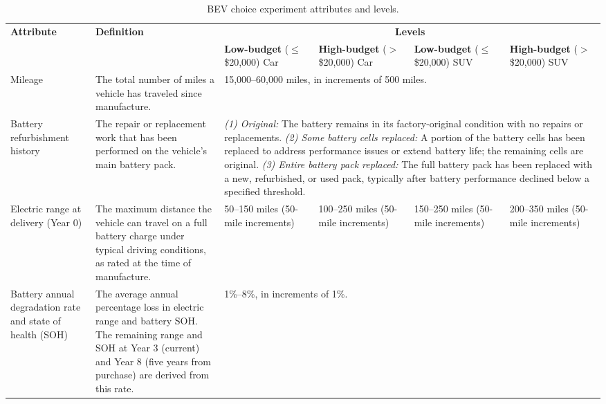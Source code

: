 \documentclass[a4paper,fleqn]{cas-sc}   %
\begin{document}
\begin{table}[pos=H]
\caption{BEV choice experiment attributes and levels.}
\label{table:dce_attributes}
\begin{adjustbox}{width=\textwidth, center}
{\renewcommand{\arraystretch}{1.4}
\begin{tabular}{p{3.2cm} p{4.8cm} p{3cm} p{3cm} p{3cm} p{3cm}}
\toprule
\multirow{2}{*}{\textbf{Attribute}} & \multirow{2}{*}{\textbf{Definition}} & \multicolumn{4}{c}{\textbf{Levels}} \\
\cmidrule(lr){3-6}
 & & \textbf{Low-budget} \newline ($\leq$\$20,000) Car & \textbf{High-budget} \newline ($>$\$20,000) Car & \textbf{Low-budget} \newline ($\leq$\$20,000) SUV & \textbf{High-budget} \newline ($>$\$20,000) SUV \\
\midrule
Mileage & The total number of miles a vehicle has traveled since manufacture. & \multicolumn{4}{p{12.5cm}}{15,000--60,000 miles, in increments of 500 miles.} \\
\addlinespace[4pt]
Battery refurbishment history & The repair or replacement work that has been performed on the vehicle's main battery pack. & \multicolumn{4}{p{12.5cm}}{%
  \textit{(1) Original:} The battery remains in its factory-original condition with no repairs or replacements.\newline
  \textit{(2) Some battery cells replaced:} A portion of the battery cells has been replaced to address performance issues or extend battery life; the remaining cells are original.\newline
  \textit{(3) Entire battery pack replaced:} The full battery pack has been replaced with a new, refurbished, or used pack, typically after battery performance declined below a specified threshold.} \\
\addlinespace[4pt]
Electric range at delivery (Year 0) & The maximum distance the vehicle can travel on a full battery charge under typical driving conditions, as rated at the time of manufacture. & 50--150 miles \newline (50-mile increments) & 100--250 miles \newline (50-mile increments) & 150--250 miles \newline (50-mile increments) & 200--350 miles \newline (50-mile increments) \\
\addlinespace[4pt]
Battery annual degradation rate and state of health (SOH) & The average annual percentage loss in electric range and battery SOH. The remaining range and SOH at Year 3 (current) and Year 8 (five years from purchase) are derived from this rate. & \multicolumn{4}{p{12.5cm}}{1\%--8\%, in increments of 1\%.} \\

\end{tabular}}
\end{adjustbox}
\end{table}
\end{document}
